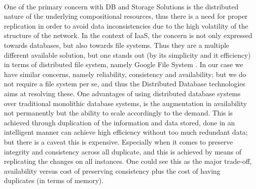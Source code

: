 \documentclass[11pt]{amsart}
\begin{document}
\begin{enumarate}
          \\ One of the primary concern with DB and Storage Solutions is the distributed
          nature of the underlying compositional resources, thus there is a need for
          proper replication in order to avoid data inconsistencies due to the high
          volatility of the structure of the network. In the context of IaaS, the concern
          is not only expressed towards databases, but also towards file systems. Thus
          they are a multiple different available solution, but one stands out (by its
          simplicity and it efficiency) in terms of distributed file system, namely Google
          File System \cite{gfs}. In our case we have similar concerns, namely
          reliability, consistency and availability; but we do not require a file system
          per se, and thus the Distributed Database technologies aims at resolving
          these. One advantages of using distributed database systems over traditional
          monolithic database systems, is the augmentation in availability not permanently
          but the ability to scale accordingly to the demand. This is achieved through
          duplication of the information and data stored, done in an intelligent manner
          can achieve high efficiency without too much redundant data; but there is a
          caveat this is expensive. Especially when it comes to preserve integrity and
          consistency across all duplicate, and this is achieved by means of replicating
          the changes on all instances. One could see this as the major trade-off,
          availability versus cost of preserving consistency plus the cost of having
          duplicates (in terms of memory). 


\end{enumarate}
\end{document}
